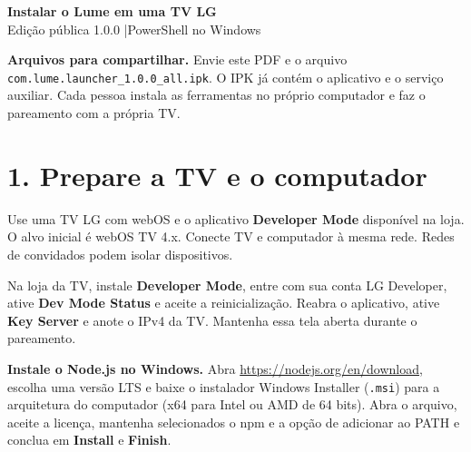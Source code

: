 \documentclass[11pt,a4paper]{article}
\begin{document}
\sloppy
{\LARGE\bfseries Instalar o Lume em uma TV LG}\\[4pt]
Edição pública 1.0.0 \quad|\quad PowerShell no Windows
\par\textbf{Arquivos para compartilhar.} Envie este PDF e o arquivo
\verb|com.lume.launcher_1.0.0_all.ipk|. O IPK já contém o aplicativo e o serviço auxiliar. Cada pessoa instala as ferramentas no próprio computador e faz o pareamento com a própria TV.
\section*{1. Prepare a TV e o computador}
Use uma TV LG com webOS e o aplicativo \textbf{Developer Mode} disponível na loja. O alvo inicial é webOS TV 4.x. Conecte TV e computador à mesma rede. Redes de convidados podem isolar dispositivos.

Na loja da TV, instale \textbf{Developer Mode}, entre com sua conta LG Developer, ative \textbf{Dev Mode Status} e aceite a reinicialização. Reabra o aplicativo, ative \textbf{Key Server} e anote o IPv4 da TV. Mantenha essa tela aberta durante o pareamento.

\textbf{Instale o Node.js no Windows.} Abra \url{https://nodejs.org/en/download}, escolha uma versão LTS e baixe o instalador Windows Installer (\verb|.msi|) para a arquitetura do computador (x64 para Intel ou AMD de 64 bits). Abra o arquivo, aceite a licença, mantenha selecionados o npm e a opção de adicionar ao PATH e conclua em \textbf{Install} e \textbf{Finish}.
\end{document}
